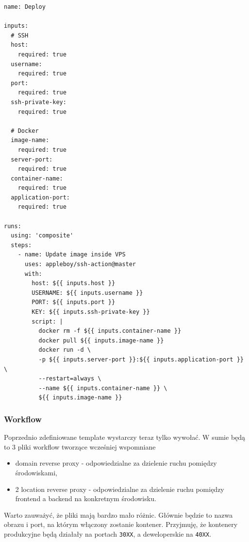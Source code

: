 \documentclass{article}
\begin{document}
\begin{lstlisting}[caption=Plik \texttt{.github/templates/deploy-container/action.yml}]
name: Deploy

inputs:
  # SSH
  host:
    required: true
  username:
    required: true
  port:
    required: true
  ssh-private-key:
    required: true

  # Docker
  image-name:
    required: true
  server-port:
    required: true
  container-name:
    required: true
  application-port:
    required: true

runs:
  using: 'composite'
  steps:
    - name: Update image inside VPS
      uses: appleboy/ssh-action@master
      with:
        host: ${{ inputs.host }}
        USERNAME: ${{ inputs.username }}
        PORT: ${{ inputs.port }}
        KEY: ${{ inputs.ssh-private-key }}
        script: |
          docker rm -f ${{ inputs.container-name }}
          docker pull ${{ inputs.image-name }}
          docker run -d \
          -p ${{ inputs.server-port }}:${{ inputs.application-port }} \
          --restart=always \
          --name ${{ inputs.container-name }} \
          ${{ inputs.image-name }}
\end{lstlisting}

\subsubsection{Workflow}

Poprzednio zdefiniowane template wystarczy teraz tylko wywołać. W sumie będą to 3 pliki workflow tworzące wcześniej wspomniane

\begin{itemize}
    \item domain reverse proxy - odpowiedzialne za dzielenie ruchu pomiędzy środowiskami,
    \item 2 location reverse proxy - odpowiedzialne za dzielenie ruchu pomiędzy frontend a backend na konkretnym środowisku.
\end{itemize}

Warto zauważyć, że pliki mają bardzo mało różnic. Głównie będzie to nazwa obrazu i port, na którym włączony zostanie kontener. Przyjmuję, że kontenery produkcyjne będą działały na portach \lstinline|30XX|, a deweloperskie na \lstinline|40XX|. 
\end{document}

